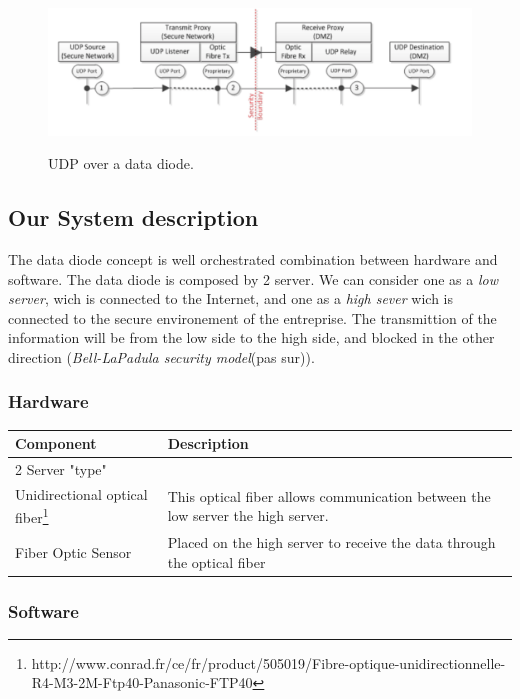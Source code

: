 \documentclass[a4paper,10pt]{article}
\begin{document}
 
\begin{figure}
\centering
\includegraphics[scale=0.5]{images/UDPOverDD.png}
\label{fig:UDPDD}
\caption{UDP over a data diode.}
\end{figure}


\subsection{Our System description}
The data diode concept is well orchestrated combination between hardware and software. The data diode is composed by 2 server. We can consider one as a \textit{low server}, wich is connected to the Internet, and one as a \textit{high sever} wich is connected to the secure environement of the entreprise. 
The transmittion of the information will be from the low side to the high side, and blocked in the other direction (\textit{Bell-LaPadula security model}(pas sur)).

\subsubsection{Hardware}

\begin{tabular}{|p{3cm}|p{10.5cm}|}
	\hline
	\textbf{Component} & \textbf{Description}                 \\
	\hline
	2 Server "type" &    \\
	\hline
	Unidirectional optical fiber\footnote{http://www.conrad.fr/ce/fr/product/505019/Fibre-optique-unidirectionnelle-R4-M3-2M-Ftp40-Panasonic-FTP40} & This optical fiber allows communication between the low server the high server.                    \\
	\hline
	Fiber Optic Sensor & Placed on the high server
    to receive the data through the optical fiber \\
	\hline
\end{tabular}

\subsubsection{Software}
\end{document}
